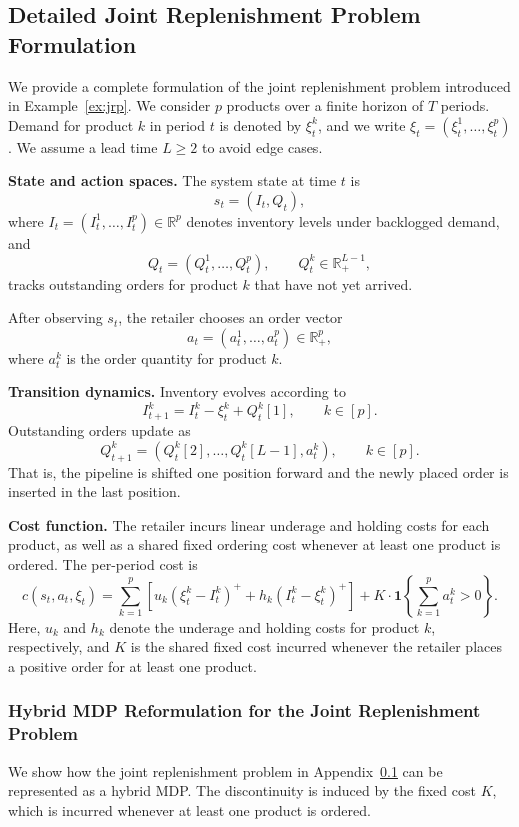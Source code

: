 \documentclass{article}
\theoremstyle{definition}
\theoremstyle{remark}
\begin{document}
\subsection{Detailed Joint Replenishment Problem Formulation}
\label{appendix:jrp-model}

We provide a complete formulation of the joint replenishment problem introduced in
Example~\ref{ex:jrp}. We consider $p$ products over a finite horizon of
$T$ periods. Demand for product $k$ in period $t$ is denoted by $\xi_t^k$, and we write
$\xi_t = (\xi_t^1,\ldots,\xi_t^p)$. We assume a lead time $L \geq 2$ to avoid edge cases.

\textbf{State and action spaces.}
The system state at time $t$ is
\[
s_t = (I_t, Q_t),
\]
where $I_t = (I_t^1,\ldots,I_t^p) \in \mathbb{R}^p$ denotes inventory levels under
backlogged demand, and
\[
Q_t = (Q_t^1,\ldots,Q_t^p),
\qquad Q_t^k \in \mathbb{R}_+^{L-1},
\]
tracks outstanding orders for product $k$ that have not yet arrived.

After observing $s_t$, the retailer chooses an order vector
\[
a_t = (a_t^1,\ldots,a_t^p) \in \mathbb{R}_+^p,
\]
where $a_t^k$ is the order quantity for product $k$.

\textbf{Transition dynamics.}
Inventory evolves according to
\[
I_{t+1}^k = I_t^k - \xi_t^k + Q_t^k[1],
\qquad k \in [p].
\]
Outstanding orders update as
\[
Q_{t+1}^k =
(Q_t^k[2],\ldots,Q_t^k[L-1],a_t^k),
\qquad k \in [p].
\]
That is, the pipeline is shifted one position forward and the newly placed order is inserted
in the last position.

\textbf{Cost function.}
The retailer incurs linear underage and holding costs for each product, as well as a shared
fixed ordering cost whenever at least one product is ordered. The per-period cost is
\[
c(s_t,a_t,\xi_t)
=
\sum_{k=1}^p
\left[
u_k(\xi_t^k - I_t^k)^+
+
h_k(I_t^k - \xi_t^k)^+
\right]
+
K \cdot \mathbf{1}\left\{\sum_{k=1}^p a_t^k > 0\right\}.
\]
Here, $u_k$ and $h_k$ denote the underage and holding costs for product $k$, respectively,
and $K$ is the shared fixed cost incurred whenever the retailer places a positive order for
at least one product.

\subsubsection{Hybrid MDP Reformulation for the Joint Replenishment Problem}
\label{appendix:jrp-reformulation}

We show how the joint replenishment problem in Appendix~\ref{appendix:jrp-model}
can be represented as a hybrid MDP. The discontinuity is induced by the fixed
cost $K$, which is incurred whenever at least one product is ordered.
\end{document}
